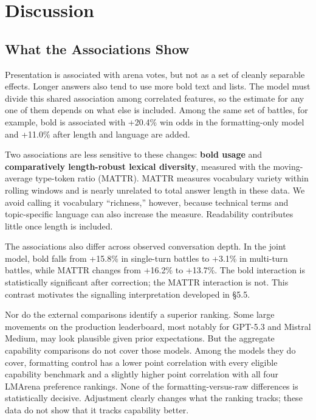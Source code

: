 \documentclass[
]{article}
\begin{document}
\section{Discussion}\label{discussion}

\subsection{What the Associations Show}\label{what-the-results-show}

Presentation is associated with arena votes, but not as a set of cleanly
separable effects. Longer answers also tend to use more bold text and
lists. The model must divide this shared association among correlated
features, so the estimate for any one of them depends on what else is
included. Among the same set of battles, for example, bold is associated
with +20.4\% win odds in the formatting-only model and +11.0\% after
length and language are added.

Two associations are less sensitive to these changes: \textbf{bold
usage} and \textbf{comparatively length-robust lexical diversity},
measured with the moving-average type-token ratio (MATTR). MATTR measures
vocabulary variety within rolling windows and is nearly unrelated to
total answer length in these data. We avoid calling it vocabulary
“richness,” however, because technical terms and topic-specific
language can also increase the measure. Readability contributes little
once length is included.

The associations also differ across observed conversation depth. In the
joint model, bold falls from +15.8\% in single-turn battles to +3.1\% in
multi-turn battles, while MATTR changes from +16.2\% to +13.7\%. The
bold interaction is statistically significant after correction; the
MATTR interaction is not. This contrast motivates the signalling
interpretation developed in §5.5.

Nor do the external comparisons identify a superior ranking. Some large
movements on the production leaderboard, most notably for GPT-5.3 and
Mistral Medium, may look plausible given prior expectations. But the
aggregate capability comparisons do not cover those models. Among the
models they do cover, formatting control has a lower point correlation
with every eligible capability benchmark and a slightly higher point
correlation with all four LMArena preference rankings. None of the
formatting-versus-raw differences is statistically decisive. Adjustment
clearly changes what the ranking tracks; these data do not show that it
tracks capability better.
\end{document}
